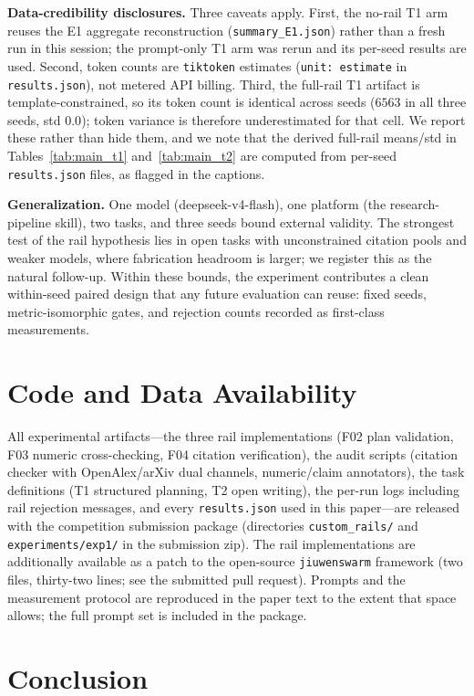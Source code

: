 \documentclass[10pt,twocolumn]{article}
\begin{document}
\textbf{Data-credibility disclosures.} Three caveats apply. First, the no-rail T1 arm reuses the E1 aggregate reconstruction (\texttt{summary\_E1.json}) rather than a fresh run in this session; the prompt-only T1 arm was rerun and its per-seed results are used. Second, token counts are \texttt{tiktoken} estimates (\texttt{unit: estimate} in \texttt{results.json}), not metered API billing. Third, the full-rail T1 artifact is template-constrained, so its token count is identical across seeds ($6563$ in all three seeds, std $0.0$); token variance is therefore underestimated for that cell. We report these rather than hide them, and we note that the derived full-rail means/std in Tables~\ref{tab:main_t1} and~\ref{tab:main_t2} are computed from per-seed \texttt{results.json} files, as flagged in the captions.

\textbf{Generalization.} One model (deepseek-v4-flash), one platform (the research-pipeline skill), two tasks, and three seeds bound external validity. The strongest test of the rail hypothesis lies in open tasks with unconstrained citation pools and weaker models, where fabrication headroom is larger; we register this as the natural follow-up. Within these bounds, the experiment contributes a clean within-seed paired design that any future evaluation can reuse: fixed seeds, metric-isomorphic gates, and rejection counts recorded as first-class measurements.

\section*{Code and Data Availability}
All experimental artifacts---the three rail implementations (F02 plan validation, F03 numeric cross-checking, F04 citation verification), the audit scripts (citation checker with OpenAlex/arXiv dual channels, numeric/claim annotators), the task definitions (T1 structured planning, T2 open writing), the per-run logs including rail rejection messages, and every \texttt{results.json} used in this paper---are released with the competition submission package (directories \texttt{custom\_rails/} and \texttt{experiments/exp1/} in the submission zip). The rail implementations are additionally available as a patch to the open-source \texttt{jiuwenswarm} framework (two files, thirty-two lines; see the submitted pull request). Prompts and the measurement protocol are reproduced in the paper text to the extent that space allows; the full prompt set is included in the package.

\section{Conclusion}
\label{sec:conclusion}
\end{document}
